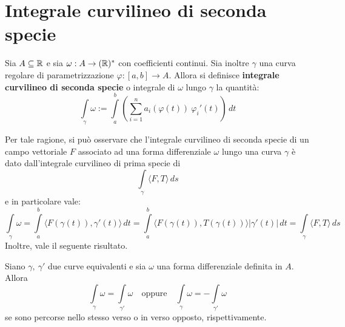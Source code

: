 \section{Integrale curvilineo di seconda specie}
\begin{definition} \label{Def: Integrale curvilineo di seconda specie}
    Sia $A \subseteq \mathbb{R}$ e sia $\omega: A \to (\mathbb{R})^*$ con coefficienti continui. Sia inoltre $\gamma$ una curva regolare di parametrizzazione $\varphi: [a, b] \to A$. Allora si definisce \textbf{integrale curvilineo di seconda specie} o integrale di $\omega$ lungo $\gamma$ la quantità:
    \begin{equation} \label{Eq: Integrale curvilineo di seconda specie}
        \int\limits_\gamma \omega := \int\limits_{a}^{b}\left( \sum\limits_{i=1}^{n}{a_i(\varphi(t))\ \varphi_i'(t)}\right)\, dt
    \end{equation}
\end{definition}
Per tale ragione, si può osservare che l'integrale curvilineo di seconda specie di un campo vettoriale $F$ associato ad una forma differenziale $\omega$ lungo una curva $\gamma$ è dato dall'integrale curvilineo di prima specie di 
\begin{equation*}
    \int\limits_{\gamma}{\langle F, T \rangle}\, ds
\end{equation*}
e in particolare vale:
\begin{equation*}
    \int\limits_{\gamma}{\omega}= \int\limits_{a}^{b} {\langle F(\gamma(t)), \gamma'(t)\rangle}\, dt = \int\limits_{a}^{b} {\langle F(\gamma(t)), T(\gamma(t))\rangle} |\gamma'(t)|\, dt = \int\limits_{\gamma}{\langle F, T \rangle}\, ds
\end{equation*}
Inoltre, vale il seguente risultato.
\begin{theorem} \label{Teo: Invarianza per equivalenza di curve dell'integrale curv di 2 specie}
    Siano $\gamma,\ \gamma'$ due curve equivalenti e sia $\omega$ una forma differenziale definita in $A$. Allora
    \begin{equation*}
        \int\limits_\gamma { \omega} = \int\limits_{\gamma'}{\omega}\quad \text{oppure} \quad \int\limits_\gamma { \omega} = -\int\limits_{\gamma'}{\omega}
    \end{equation*}
    se sono percorse nello stesso verso o in verso opposto, rispettivamente.
\end{theorem}

